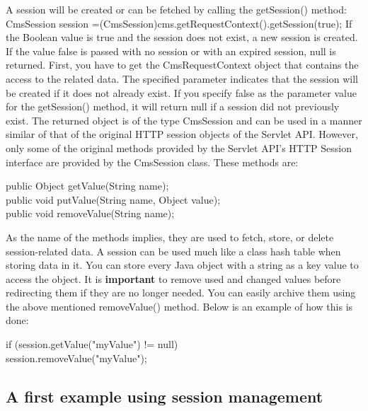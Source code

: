 A session will be created or can be fetched by calling the {\meth getSession()}
method: {\meth CmsSession session =(CmsSession)cms.getRequestContext().getSession(true);}
If  the Boolean value is true and the session does not exist, a new
session is created. If the value false is passed with no session or
with an expired session, null is returned.
First, you have to get the CmsRequestContext object that contains the
access  to the related data. The specified parameter indicates that the
session will be created if it does not already exist. If you specify
false as the parameter value for the {\meth getSession()} method, it will
return null if a session did not previously exist. The returned object
is of the type {\class CmsSession} and can be used in a manner similar of that
of the original HTTP session objects of the Servlet API. However, only
some of the original methods provided by the Servlet API's HTTP Session
interface are provided by the {\class CmsSession} class. These methods are:

\begin{java}
public Object getValue(String name);\\
public void putValue(String name, Object value);\\
public void removeValue(String name);\\
\end{java}

As the name of the methods implies, they are used to fetch, store, or
delete session-related data. A session can be used much like a class
hash table when storing data in it. You can store every Java object
with a string as a key value to access the object.
It is {\bf important} to remove used and changed values before redirecting
them if they are no longer needed. You can easily archive them using
the above mentioned {\meth removeValue()} method. Below is an example of how this
is done:

\begin{java}
if (session.getValue("myValue") != null)\\
        session.removeValue("myValue");\\
\end{java}

\subsection{A first example using session management}

